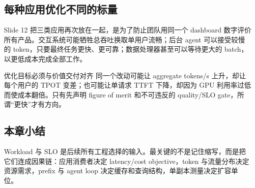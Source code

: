 \subsection{每种应用优化不同的标量}

Slide 12 把三类应用再次放在一起，是为了防止团队用同一个 dashboard 数字评价所有产品。交互系统可能牺牲总吞吐换取单用户流畅；后台 agent 可以接受较慢的 token，只要最终任务更快、更可靠；数据处理器甚至可以等待更大的 batch，以更低成本完成全部工作。


\begin{importantbox}{优化目标必须与价值交付对齐}
同一个改动可能让 aggregate tokens/s 上升，却让每个用户的 TPOT 变差；也可能让单请求 TTFT 下降，却因为 GPU 利用率过低而使成本翻倍。只有先声明 figure of merit 和不可违反的 quality/SLO gate，所谓“更快”才有方向。
\end{importantbox}

\subsection{本章小结}

Workload 与 SLO 是后续所有工程选择的输入。最关键的不是记住缩写，而是把它们连成因果链：应用消费者决定 latency/cost objective，token 与流量分布决定资源需求，prefix 与 agent loop 决定缓存和查询结构，单副本测量决定扩容单位。


